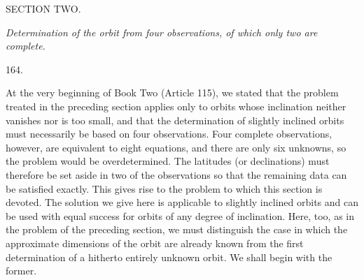 \clearpage
{}
\begin{center}
{\large SECTION TWO.}\par\medskip
\emph{Determination of the orbit from four observations, of which only two are complete.}\par\bigskip
\hypertarget{native-228-article164}{}164.
\end{center}
At the very beginning of Book Two (Article 115), we stated that the problem treated in the preceding section applies only to orbits whose inclination neither vanishes nor is too small, and that the determination of slightly inclined orbits must necessarily be based on four observations. Four complete observations, however, are equivalent to eight equations, and there are only six unknowns, so the problem would be overdetermined. The latitudes (or declinations) must therefore be set aside in two of the observations so that the remaining data can be satisfied exactly. This gives rise to the problem to which this section is devoted. The solution we give here is applicable to slightly inclined orbits and can be used with equal success for orbits of any degree of inclination. Here, too, as in the problem of the preceding section, we must distinguish the case in which the approximate dimensions of the orbit are already known from the first determination of a hitherto entirely unknown orbit. We shall begin with the former.
